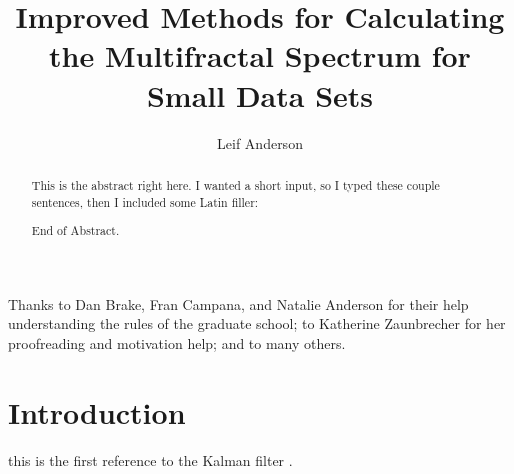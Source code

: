 \documentclass[draft, masters]{csuthesis} %
\title[Improved Multifractal Calculations]{Improved Methods for Calculating the Multifractal Spectrum for Small Data Sets}
\author{Leif Anderson}
\begin{document}
\frontmatter

% 
\begin{abstract}
This is the abstract right here. I wanted a short input, so I typed these couple sentences, then I included some Latin filler: %

End of Abstract.
\end{abstract}

\begin{acknowledgements}
Thanks to Dan Brake, Fran Campana, and Natalie Anderson for their help understanding the rules of the graduate school; to Katherine Zaunbrecher for her proofreading and motivation help; and to many others.
\end{acknowledgements}%

\maketitle


\tableofcontents %
\listoftables %
\listoffigures %

\mainmatter %
\chapter{Introduction}

this is the first reference to the Kalman filter \cite{kalmanFilter}.
\end{document}
